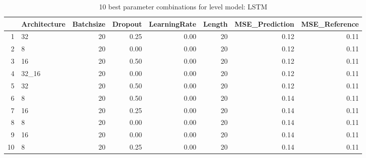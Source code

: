 \begin{table}[ht]
\centering
\begin{tabular}{rlrrrrrr}
  \hline
 & Architecture & Batchsize & Dropout & LearningRate & Length & MSE\_Prediction & MSE\_Reference \\ 
  \hline
1 & 32 &  20 & 0.25 & 0.00 &  20 & 0.12 & 0.11 \\ 
  2 & 8 &  20 & 0.00 & 0.00 &  20 & 0.12 & 0.11 \\ 
  3 & 16 &  20 & 0.50 & 0.00 &  20 & 0.12 & 0.11 \\ 
  4 & 32\_16 &  20 & 0.00 & 0.00 &  20 & 0.12 & 0.11 \\ 
  5 & 32 &  20 & 0.50 & 0.00 &  20 & 0.12 & 0.11 \\ 
  6 & 8 &  20 & 0.50 & 0.00 &  20 & 0.14 & 0.11 \\ 
  7 & 16 &  20 & 0.25 & 0.00 &  20 & 0.14 & 0.11 \\ 
  8 & 8 &  20 & 0.00 & 0.00 &  20 & 0.14 & 0.11 \\ 
  9 & 16 &  20 & 0.00 & 0.00 &  20 & 0.14 & 0.11 \\ 
  10 & 8 &  20 & 0.25 & 0.00 &  20 & 0.14 & 0.11 \\ 
   \hline
\end{tabular}
\caption{10 best parameter combinations for level model: LSTM} 
\label{tab:LSTM_top_10}
\end{table}

